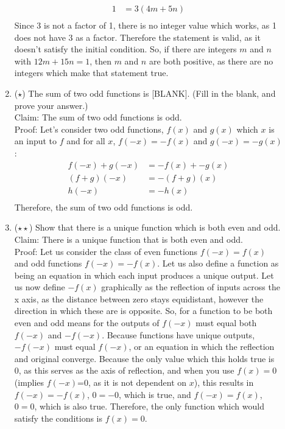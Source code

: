 \documentclass{letter}
\theoremstyle{definition}
\begin{document}
\begin{description}
\begin{enumerate}
\begin{align*}
 1 &= 3(4m+5n) \\
\end{align*}
Since 3 is not a factor of 1, there is no integer value which works, as 1 does not have 3 as a factor. Therefore the statement is valid, as it doesn't satisfy the initial condition. So, if there are integers $m$ and $n$ with $12m+15n=1$, then $m$ and $n$ are both positive, as there are no integers which make that statement true.  \\
		\item ($\star$) The sum of two odd functions is [BLANK]. (Fill in the blank, and prove your answer.) \\
Claim: The sum of two odd functions is odd. \\
Proof: Let's consider two odd functions, $f(x)$ and $g(x)$ which $x$ is an input to $f$ and for all $x$, $f(-x)=-f(x)$ and $g(-x)=-g(x)$: \\
\begin{align*}
f(-x) + g(-x) &= -f(x) + -g(x) \tag{addition of two functions} \\
(f+g)(-x) &= -(f+g)(x) \tag{factor our (-x) from left side and (-x) and -1 from right side} \\
h(-x) &= -h(x) \tag{Set f+g=h} \\
\end{align*}
Therefore, the sum of two odd functions is odd. \\

		\item ($\star \star$) Show that there is a unique function which is both even and odd. \\
Claim: There is a unique function that is both even and odd. \\
Proof: Let us consider the class of even functions $f(-x)=f(x)$ and odd functions $f(-x)=-f(x)$. Let us also define a function as being an equation in which each input produces a unique output. Let us now define $-f(x)$ graphically as the reflection of inputs across the x axis, as the distance between zero stays equidistant, however the direction in which these are is opposite. So, for a function to be both even and odd means for the outputs of $f(-x)$ must equal both $f(-x)$ and $-f(-x)$. Because functions have unique outputs, $-f(-x)$ must equal $f(-x)$, or an equation in which the reflection and original converge. Because the only value which this holds true is 0, as this serves as the axis of reflection, and when you use $f(x)=0$ (implies $f(-x)$=0, as it is not dependent on $x$), this results in $f(-x)=-f(x)$, $0=-0$, which is true, and $f(-x)=f(x)$, $0=0$, which is also true. Therefore, the only function which would satisfy the conditions is $f(x)=0$.  
\end{enumerate}
\end{description}
\end{document}

